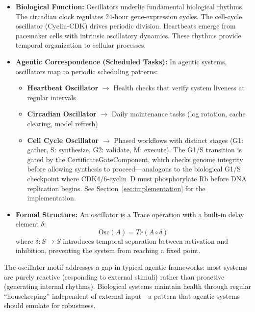 \begin{itemize}[leftmargin=*]
\item \textbf{Biological Function:} Oscillators underlie fundamental biological rhythms. The circadian clock regulates 24-hour gene-expression cycles. The cell-cycle oscillator (Cyclin-CDK) drives periodic division. Heartbeats emerge from pacemaker cells with intrinsic oscillatory dynamics. These rhythms provide temporal organization to cellular processes.
\item \textbf{Agentic Correspondence (Scheduled Tasks):} In agentic systems, oscillators map to periodic scheduling patterns:
\begin{itemize}
\item \textbf{Heartbeat Oscillator} $\to$ Health checks that verify system liveness at regular intervals
\item \textbf{Circadian Oscillator} $\to$ Daily maintenance tasks (log rotation, cache clearing, model refresh)
\item \textbf{Cell Cycle Oscillator} $\to$ Phased workflows with distinct stages (G1: gather, S: synthesize, G2: validate, M: execute).  The G1/S transition is gated by the CertificateGateComponent, which checks genome integrity before allowing synthesis to proceed---analogous to the biological G1/S checkpoint where CDK4/6-cyclin~D must phosphorylate Rb before DNA replication begins.  See Section~\ref{sec:implementation} for the implementation.
\end{itemize}
\item \textbf{Formal Structure:} An oscillator is a Trace operation with a built-in delay element $\delta$:
\begin{equation}
\mathrm{Osc}(A) = Tr(A \circ \delta)
\label{eq:oscillator-trace}
\end{equation}
where $\delta: S \to S$ introduces temporal separation between activation and inhibition, preventing the system from reaching a fixed point.
\end{itemize}

The oscillator motif addresses a gap in typical agentic frameworks: most systems are purely reactive (responding to external stimuli) rather than proactive (generating internal rhythms). Biological systems maintain health through regular ``housekeeping'' independent of external input---a pattern that agentic systems should emulate for robustness.

